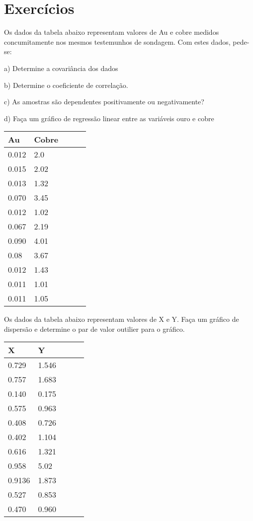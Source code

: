 \section{Exercícios}

\begin{exercise}
	
	Os dados da tabela abaixo representam valores de Au e cobre medidos concumitamente nos mesmos testemunhos de sondagem. Com estes dados, pede-se:
	
	a) Determine a covariância dos dados 
	
	b) Determine o coeficiente de correlação.
	
	c) As amostras são dependentes positivamente ou negativamente?
	
	d) Faça um gráfico de regressão linear entre as variáveis ouro e cobre
	
	\begin{tabular}{lllll}
		\hline
		Au & Cobre &  &  &  \\ \hline
		0.012      & 2.0  &  &  &  \\
		0.015      & 2.02 &  &  &  \\
		0.013      & 1.32 &  &  &  \\
		0.070      & 3.45 &  &  &  \\
		0.012      & 1.02 &  &  &  \\
		0.067      & 2.19 &  &  &  \\
		0.090      & 4.01 &  &  &  \\
		0.08      & 3.67 &  &  &  \\
		0.012      & 1.43 &  &  &  \\
		0.011      & 1.01 &  &  &  \\
		0.011      & 1.05 &  &  &  \\ \hline
	\end{tabular}
\end{exercise}

\begin{exercise}
	
	Os dados da tabela abaixo representam valores de X e Y. Faça um gráfico de dispersão e determine o par de valor outilier para o gráfico.
	
	\begin{tabular}{lllll}
		\hline
		X & Y &  &  &  \\ \hline
		0.729      & 1.546&  &  &  \\
		0.757      & 1.683&  &  &  \\
		0.140      & 0.175 &  &  &  \\
		0.575      & 0.963 &  &  &  \\
		0.408      & 0.726 &  &  &  \\
		0.402      & 1.104 &  &  &  \\
		0.616      & 1.321 &  &  &  \\
		0.958      & 5.02 &  &  &  \\
		0.9136      & 1.873 &  &  &  \\
		0.527      & 0.853 &  &  &  \\
		0.470      & 0.960 &  &  &  \\ \hline
	\end{tabular}
\end{exercise}